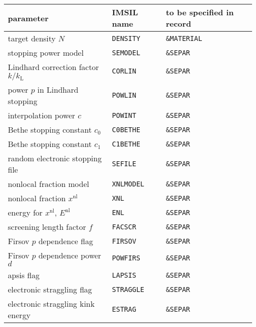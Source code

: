 \begin{center}
\begin{tabular}{lll}
   parameter \quad & IMSIL name & to be specified in record \\
   \hline
   target density $N$                      & {\tt DENSITY}  & {\tt \&MATERIAL} \\
   stopping power model                    & {\tt SEMODEL}  & {\tt \&SEPAR} \\
   Lindhard correction factor $k/k_\mathrm{L}$ & {\tt CORLIN} & {\tt \&SEPAR} \\
   power $p$ in Lindhard stopping          & {\tt POWLIN}   & {\tt \&SEPAR} \\
   interpolation power $c$                 & {\tt POWINT}   & {\tt \&SEPAR} \\
   Bethe stopping constant $c_0$           & {\tt C0BETHE}  & {\tt \&SEPAR} \\
   Bethe stopping constant $c_1$           & {\tt C1BETHE}  & {\tt \&SEPAR} \\
   random electronic stopping file         & {\tt SEFILE}   & {\tt \&SEPAR} \\
   nonlocal fraction model                 & {\tt XNLMODEL} & {\tt \&SEPAR} \\
   nonlocal fraction $x^\mathrm{nl}$       & {\tt XNL}      & {\tt \&SEPAR} \\
   energy for $x^\mathrm{nl}$, $E^\mathrm{nl}$ & {\tt ENL}  & {\tt \&SEPAR} \\
   screening length factor $f$             & {\tt FACSCR}   & {\tt \&SEPAR} \\
   Firsov $p$ dependence flag              & {\tt FIRSOV}   & {\tt \&SEPAR} \\
   Firsov $p$ dependence power $d$         & {\tt POWFIRS}  & {\tt \&SEPAR} \\
   apsis flag                              & {\tt LAPSIS}   & {\tt \&SEPAR} \\
   electronic straggling flag              & {\tt STRAGGLE} & {\tt \&SEPAR} \\
   electronic straggling kink energy       & {\tt ESTRAG}   & {\tt \&SEPAR} \\
\end{tabular}
\end{center}
